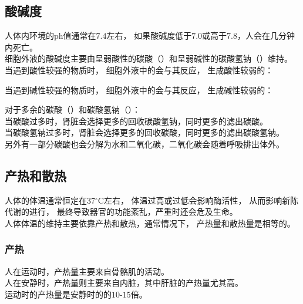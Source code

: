 \documentclass[UTF8]{ctexart}
\begin{document}
\subsection{酸碱度}
    人体内环境的ph值通常在$7.4$左右，
    如果酸碱度低于$7.0$或高于$7.8$，人会在几分钟内死亡。\\[3mm]
    细胞外液的酸碱度主要由呈弱酸性的碳酸（）和呈弱碱性的碳酸氢钠（）维持。\\[6mm]
    当遇到酸性较强的物质时，
    细胞外液中的会与其反应，
    生成酸性较弱的：
    \begin{center}
    \end{center}
    \vspace{5pt}
    当遇到碱性较强的物质时，
    细胞外液中的会与其反应，
    生成碱性较弱的：
    \begin{center}
    \end{center}
    \vspace{8pt}
    对于多余的碳酸（）和碳酸氢钠（）：\\[3mm]
    当碳酸过多时，肾脏会选择更多的回收碳酸氢钠，同时更多的滤出碳酸。\\[3mm]
    当碳酸氢钠过多时，肾脏会选择更多的回收碳酸，同时更多的滤出碳酸氢钠。\\[3mm]
    另外有一部分碳酸也会分解为水和二氧化碳，二氧化碳会随着呼吸排出体外。

\newpage

\subsection{产热和散热}
    人体的体温通常恒定在37$^{\circ}$C左右，
    体温过高或过低会影响酶活性，
    从而影响新陈代谢的进行，
    最终导致器官的功能紊乱，严重时还会危及生命。\\[3mm]
    人体体温的维持主要依靠产热和散热，通常情况下，
    产热量和散热量是相等的。
    
\subsubsection{产热}
    人在运动时，产热量主要来自骨骼肌的活动。\\[3mm]
    人在安静时，产热量则主要来自内脏，其中肝脏的产热量尤其高。\\[3mm]
    运动时的产热量是安静时的的$10$-$15$倍。
\end{document}
